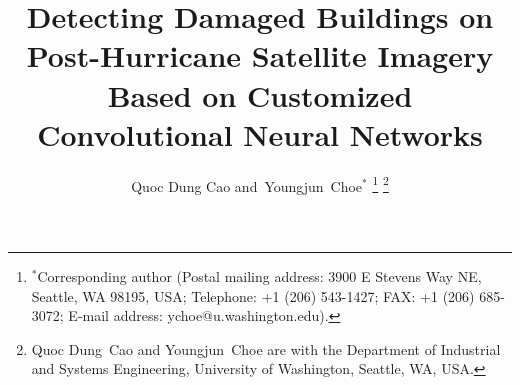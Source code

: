 \documentclass[journal, 12pt, onecolumn,draftclsnofoot]{IEEEtran}
\begin{document}
%
\title{Detecting Damaged Buildings on Post-Hurricane Satellite Imagery Based on Customized Convolutional Neural Networks}
%
%
%

\author{Quoc Dung Cao
        and~Youngjun~Choe$^{*}$%
\thanks{$^{*}$Corresponding author (Postal mailing address: 3900 E Stevens Way NE,
Seattle, WA 98195, USA; Telephone: +1 (206) 543-1427; FAX: +1 (206) 685-3072; E-mail address: ychoe@u.washington.edu).}
\thanks{Quoc Dung~Cao and Youngjun~Choe are with the Department of Industrial and Systems Engineering, University of Washington, Seattle, WA, USA.}}%


% 
%
\end{document}
